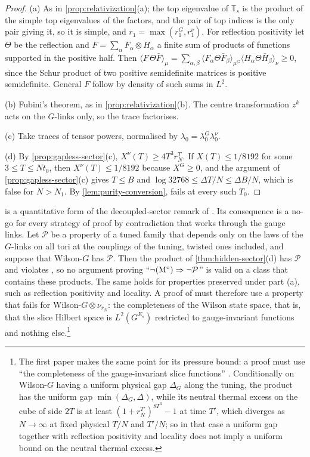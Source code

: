 \documentclass[11pt,a4paper]{amsart}
\theoremstyle{definition}
\theoremstyle{remark}
\numberwithin{equation}{section}
\newcommand{\TT}{\mathbb{T}}               %
\newcommand{\lzero}{\lambda_0}             %
\newcommand{\xconst}{\frac{1}{8192}}       %
\newcommand{\xconstinl}{1/8192}            %
\newcommand{\Mcirc}{\text{\upshape(M$^{\circ}$)}}   %
\newcommand{\tzero}{t_0}                   %
\begin{document}
\begin{proof}
(a) As in \cref{prop:relativization}(a); the top eigenvalue of $\TT_s$ is the product of the simple top eigenvalues of the factors, and the pair of top indices is the only pair giving it, so it is simple, and $r_1=\max(r_1^G,r_1^\nu)$. For reflection positivity let $\Theta$ be the reflection and $F=\sum_\alpha F_\alpha\otimes H_\alpha$ a finite sum of products of functions supported in the positive half. Then $\langle F\,\Theta\bar F\rangle_\mu=\sum_{\alpha,\beta}\langle F_\alpha\Theta\bar F_\beta\rangle_{\mu^G}\langle H_\alpha\Theta\bar H_\beta\rangle_\nu\ge0$, since the Schur product of two positive semidefinite matrices is positive semidefinite. General $F$ follow by density of such sums in $L^2$.

(b) Fubini's theorem, as in \cref{prop:relativization}(b). The centre transformation $z^k$ acts on the $G$-links only, so the trace factorises.

(c) Take traces of tensor powers, normalised by $\lzero=\lzero^G\lzero^\nu$.

(d) By \cref{prop:gapless-sector}(c), $X^\nu(T)\ge4T^3r_N^T$. If $X(T)\le\xconstinl$ for some $3\le T\le N\tzero$, then $X^\nu(T)\le\xconstinl$ because $X^G\ge0$, and the argument of \cref{prop:gapless-sector}(c) gives $T\le B$ and $\log32768\le\Delta T/N\le\Delta B/N$, which is false for $N>N_1$. By \cref{lem:purity-conversion}, \Mcirc{} fails at every such $T_0$.
\end{proof}

 is a quantitative form of the decoupled-sector remark of \cite[Proposition~6]{bhattacharjee2026first}. Its consequence is a no-go for every strategy of proof by contradiction that works through the gauge links. Let $\mathcal P$ be a property of a tuned family that depends only on the laws of the $G$-links on all tori at the couplings of the tuning, twisted ones included, and suppose that Wilson-$G$ has $\mathcal P$. Then the product of \cref{thm:hidden-sector}(d) has $\mathcal P$ and violates \Mcirc{}, so no argument proving ``$\neg\Mcirc\Rightarrow\neg\mathcal P$'' is valid on a class that contains these products. The same holds for properties preserved under part (a), such as reflection positivity and locality. A proof of \Mcirc{} must therefore use a property that fails for Wilson-$G\otimes\nu_{r_N}$: the completeness of the Wilson state space, that is, that the slice Hilbert space is $L^2(G^{E_s})$ restricted to gauge-invariant functions and nothing else.\footnote{The first paper makes the same point for its pressure bound: a proof must use ``the completeness of the gauge-invariant slice functions'' \cite{bhattacharjee2026first}. Conditionally on Wilson-$G$ having a uniform physical gap $\Delta_G$ along the tuning, the product has the uniform gap $\min(\Delta_G,\Delta)$, while its neutral thermal excess on the cube of side $2T$ is at least $(1+r_N^{T'})^{8T^3}-1$ at time $T'$, which diverges as $N\to\infty$ at fixed physical $T/N$ and $T'/N$; so in that case a uniform gap together with reflection positivity and locality does not imply a uniform bound on the neutral thermal excess.}
\end{document}
